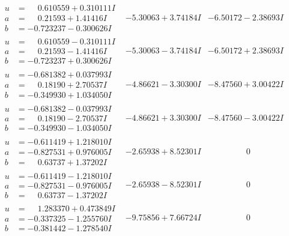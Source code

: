 \documentclass[1p]{elsarticle_modified}
\theoremstyle{definition}
\begin{document}
$$\begin{array}{c|c|c}
\begin{aligned}
u &= \phantom{-}0.610559 + 0.310111 I \\
a &= \phantom{-}0.21593 + 1.41416 I \\
b &= -0.723237 - 0.300626 I\end{aligned}
 & -5.30063 + 3.74184 I & -6.50172 - 2.38693 I \\ \hline\begin{aligned}
u &= \phantom{-}0.610559 - 0.310111 I \\
a &= \phantom{-}0.21593 - 1.41416 I \\
b &= -0.723237 + 0.300626 I\end{aligned}
 & -5.30063 - 3.74184 I & -6.50172 + 2.38693 I \\ \hline\begin{aligned}
u &= -0.681382 + 0.037993 I \\
a &= \phantom{-}0.18190 + 2.70537 I \\
b &= -0.349930 + 1.034050 I\end{aligned}
 & -4.86621 - 3.30300 I & -8.47560 + 3.00422 I \\ \hline\begin{aligned}
u &= -0.681382 - 0.037993 I \\
a &= \phantom{-}0.18190 - 2.70537 I \\
b &= -0.349930 - 1.034050 I\end{aligned}
 & -4.86621 + 3.30300 I & -8.47560 - 3.00422 I \\ \hline\begin{aligned}
u &= -0.611419 + 1.218010 I \\
a &= -0.827531 + 0.976005 I \\
b &= \phantom{-}0.63737 + 1.37202 I\end{aligned}
 & -2.65938 + 8.52301 I & \phantom{-0.000000 } 0 \\ \hline\begin{aligned}
u &= -0.611419 - 1.218010 I \\
a &= -0.827531 - 0.976005 I \\
b &= \phantom{-}0.63737 - 1.37202 I\end{aligned}
 & -2.65938 - 8.52301 I & \phantom{-0.000000 } 0 \\ \hline\begin{aligned}
u &= \phantom{-}1.283370 + 0.473849 I \\
a &= -0.337325 - 1.255760 I \\
b &= -0.381442 - 1.278540 I\end{aligned}
 & -9.75856 + 7.66724 I & \phantom{-0.000000 } 0 \\ \hline\begin{aligned}

\end{aligned}
\end{array}$$
\end{document}
